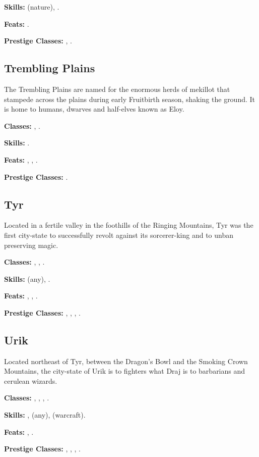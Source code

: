 \textbf{Skills:}  (nature), .

\textbf{Feats:} .

\textbf{Prestige Classes:} , .


\subsection{Trembling Plains}
The Trembling Plains are named for the enormous herds of mekillot that stampede across the plains during early Fruitbirth season, shaking the ground. It is home to humans, dwarves and half-elves known as Eloy.

\textbf{Classes:} , .

\textbf{Skills:} .

\textbf{Feats:} , , .

\textbf{Prestige Classes:} .


\subsection{Tyr}
Located in a fertile valley in the foothills of the Ringing Mountains, Tyr was the first city-state to successfully revolt against its sorcerer-king and to unban preserving magic.

\textbf{Classes:} , , .

\textbf{Skills:}  (any), .

\textbf{Feats:} , , .

\textbf{Prestige Classes:} , , , .

\subsection{Urik}
Located northeast of Tyr, between the Dragon's Bowl and the Smoking Crown Mountains, the city-state of Urik is to fighters what Draj is to barbarians and cerulean wizards.

\textbf{Classes:} , , , .

\textbf{Skills:} ,  (any),  (warcraft).

\textbf{Feats:} , .

\textbf{Prestige Classes:} , , , .
